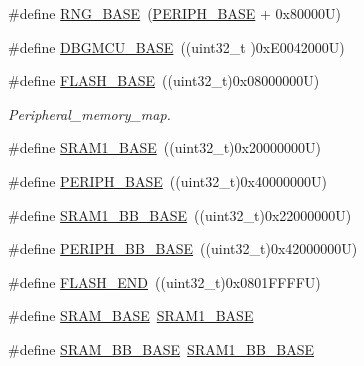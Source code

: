 \begin{DoxyCompactItemize}
\item 
\#define \hyperlink{group___peripheral__registers__structures_gab92662976cfe62457141e5b4f83d541c}{R\+N\+G\+\_\+\+B\+A\+SE}~(\hyperlink{group___peripheral__memory__map_ga9171f49478fa86d932f89e78e73b88b0}{P\+E\+R\+I\+P\+H\+\_\+\+B\+A\+SE} + 0x80000\+U)
\item 
\#define \hyperlink{group___peripheral__registers__structures_ga4adaf4fd82ccc3a538f1f27a70cdbbef}{D\+B\+G\+M\+C\+U\+\_\+\+B\+A\+SE}~((uint32\+\_\+t )0x\+E0042000\+U)
\item 
\#define \hyperlink{group___peripheral__registers__structures_ga23a9099a5f8fc9c6e253c0eecb2be8db}{F\+L\+A\+S\+H\+\_\+\+B\+A\+SE}~((uint32\+\_\+t)0x08000000\+U)
\begin{DoxyCompactList}\small\item\em Peripheral\+\_\+memory\+\_\+map. \end{DoxyCompactList}\item 
\#define \hyperlink{group___peripheral__registers__structures_ga7d0fbfb8894012dbbb96754b95e562cd}{S\+R\+A\+M1\+\_\+\+B\+A\+SE}~((uint32\+\_\+t)0x20000000\+U)
\item 
\#define \hyperlink{group___peripheral__registers__structures_ga9171f49478fa86d932f89e78e73b88b0}{P\+E\+R\+I\+P\+H\+\_\+\+B\+A\+SE}~((uint32\+\_\+t)0x40000000\+U)
\item 
\#define \hyperlink{group___peripheral__registers__structures_gac4c4f61082e4b168f29d9cf97dc3ca5c}{S\+R\+A\+M1\+\_\+\+B\+B\+\_\+\+B\+A\+SE}~((uint32\+\_\+t)0x22000000\+U)
\item 
\#define \hyperlink{group___peripheral__registers__structures_gaed7efc100877000845c236ccdc9e144a}{P\+E\+R\+I\+P\+H\+\_\+\+B\+B\+\_\+\+B\+A\+SE}~((uint32\+\_\+t)0x42000000\+U)
\item 
\#define \hyperlink{group___peripheral__registers__structures_ga8be554f354e5aa65370f6db63d4f3ee4}{F\+L\+A\+S\+H\+\_\+\+E\+ND}~((uint32\+\_\+t)0x0801\+F\+F\+F\+F\+U)
\item 
\#define \hyperlink{group___peripheral__registers__structures_ga05e8f3d2e5868754a7cd88614955aecc}{S\+R\+A\+M\+\_\+\+B\+A\+SE}~\hyperlink{group___peripheral__memory__map_ga7d0fbfb8894012dbbb96754b95e562cd}{S\+R\+A\+M1\+\_\+\+B\+A\+SE}
\item 
\#define \hyperlink{group___peripheral__registers__structures_gad3548b6e2f017f39d399358f3ac98454}{S\+R\+A\+M\+\_\+\+B\+B\+\_\+\+B\+A\+SE}~\hyperlink{group___peripheral__memory__map_gac4c4f61082e4b168f29d9cf97dc3ca5c}{S\+R\+A\+M1\+\_\+\+B\+B\+\_\+\+B\+A\+SE}
\item 

\end{DoxyCompactItemize}
